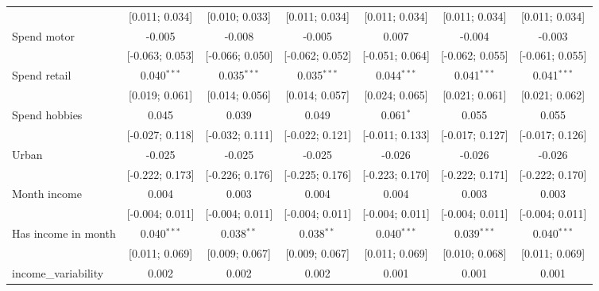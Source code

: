 \begin{table}[htbp]
\begin{threeparttable}[b]
\begin{tabular}{lcccccc}
                                   & [0.011; 0.034]    & [0.010; 0.033]   & [0.011; 0.034]   & [0.011; 0.034]   & [0.011; 0.034]   & [0.011; 0.034]\\   
         Spend motor               & -0.005            & -0.008           & -0.005           & 0.007            & -0.004           & -0.003\\   
                                   & [-0.063; 0.053]   & [-0.066; 0.050]  & [-0.062; 0.052]  & [-0.051; 0.064]  & [-0.062; 0.055]  & [-0.061; 0.055]\\   
         Spend retail              & 0.040$^{***}$     & 0.035$^{***}$    & 0.035$^{***}$    & 0.044$^{***}$    & 0.041$^{***}$    & 0.041$^{***}$\\   
                                   & [0.019; 0.061]    & [0.014; 0.056]   & [0.014; 0.057]   & [0.024; 0.065]   & [0.021; 0.061]   & [0.021; 0.062]\\   
         Spend hobbies             & 0.045             & 0.039            & 0.049            & 0.061$^{*}$      & 0.055            & 0.055\\   
                                   & [-0.027; 0.118]   & [-0.032; 0.111]  & [-0.022; 0.121]  & [-0.011; 0.133]  & [-0.017; 0.127]  & [-0.017; 0.126]\\   
         Urban                     & -0.025            & -0.025           & -0.025           & -0.026           & -0.026           & -0.026\\   
                                   & [-0.222; 0.173]   & [-0.226; 0.176]  & [-0.225; 0.176]  & [-0.223; 0.170]  & [-0.222; 0.171]  & [-0.222; 0.170]\\   
         Month income              & 0.004             & 0.003            & 0.004            & 0.004            & 0.003            & 0.003\\   
                                   & [-0.004; 0.011]   & [-0.004; 0.011]  & [-0.004; 0.011]  & [-0.004; 0.011]  & [-0.004; 0.011]  & [-0.004; 0.011]\\   
         Has income in month       & 0.040$^{***}$     & 0.038$^{**}$     & 0.038$^{**}$     & 0.040$^{***}$    & 0.039$^{***}$    & 0.040$^{***}$\\   
                                   & [0.011; 0.069]    & [0.009; 0.067]   & [0.009; 0.067]   & [0.011; 0.069]   & [0.010; 0.068]   & [0.011; 0.069]\\   
         income\_variability       & 0.002             & 0.002            & 0.002            & 0.001            & 0.001            & 0.001\\   

\end{tabular}
\end{threeparttable}
\end{table}
